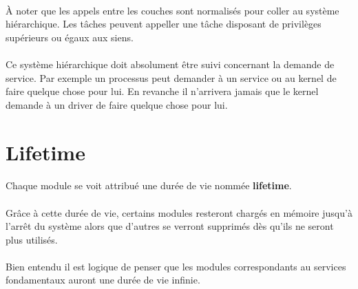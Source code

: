 \documentclass[10pt,a4wide]{article}
\begin{document}
\paragraph{}

\`A noter que les appels entre les couches sont normalis\'es pour coller
au syst\`eme hi\'erarchique. Les t\^aches peuvent appeller une t\^ache
disposant de privil\`eges sup\'erieurs ou \'egaux aux siens.

\paragraph{}

Ce syst\`eme hi\'erarchique doit absolument \^etre suivi concernant la
demande de service. Par exemple un processus peut demander \`a un service
ou au kernel de faire quelque chose pour lui. En revanche il n'arrivera jamais
que le kernel demande \`a un driver de faire quelque chose pour lui.

\section{Lifetime}

\paragraph{}

Chaque module se voit attribu\'e une dur\'ee de vie nomm\'ee
\textbf{lifetime}.

\paragraph{}

Gr\^ace \`a cette dur\'ee de vie, certains modules resteront charg\'es
en m\'emoire jusqu'\`a l'arr\^et du syst\`eme alors que d'autres se
verront supprim\'es d\`es qu'ils ne seront plus utilis\'es.

\paragraph{}

Bien entendu il est logique de penser que les modules correspondants
au services fondamentaux auront une dur\'ee de vie infinie.

\paragraph{}
\end{document}
